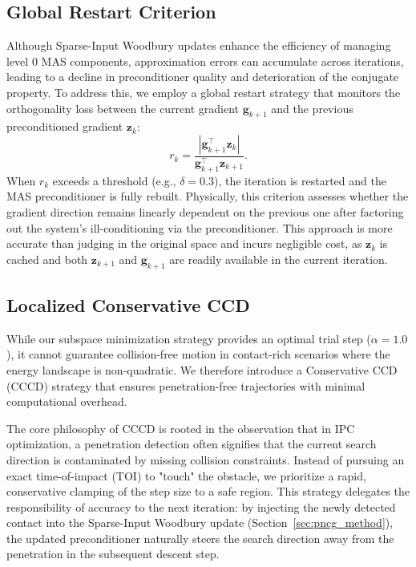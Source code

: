 \documentclass[acmtog,anonymous,review,screen,nonacm]{acmart}
\begin{document}
\subsection{Global Restart Criterion}
\label{sec:restart}
Although Sparse-Input Woodbury updates enhance the efficiency of managing level $0$ MAS components, approximation errors can accumulate across iterations, leading to a decline in preconditioner quality and deterioration of the conjugate property. To address this, we employ a global restart strategy that monitors the orthogonality loss between the current gradient $\mathbf{g}_{k+1}$ and the previous preconditioned gradient $\mathbf{z}_k$:
\begin{equation}
    r_k = \frac{|\mathbf{g}_{k+1}^\top \mathbf{z}_k|}{\mathbf{g}_{k+1}^\top \mathbf{z}_{k+1}}.
\end{equation}
When $r_k$ exceeds a threshold (e.g., $\delta =0.3$), the iteration is restarted and the MAS preconditioner is fully rebuilt. Physically, this criterion assesses whether the gradient direction remains linearly dependent on the previous one after factoring out the system's ill-conditioning via the preconditioner. This approach is more accurate than judging in the original space and incurs negligible cost, as $\mathbf{z}_k$ is cached and both $\mathbf{z}_{k+1}$ and $\mathbf{g}_{k+1}$ are readily available in the current iteration.
\vspace{-5pt} 
\subsection{Localized Conservative CCD}
\label{sec:conservative_ccd}
While our subspace minimization strategy provides an optimal trial step ($\alpha = 1.0$), it cannot guarantee collision-free motion in contact-rich scenarios where the energy landscape is non-quadratic. We therefore introduce a Conservative CCD (CCCD) strategy that ensures penetration-free trajectories with minimal computational overhead. 

The core philosophy of CCCD is rooted in the observation that in IPC optimization, a penetration detection often signifies that the current search direction is contaminated by missing collision constraints. Instead of pursuing an exact time-of-impact (TOI) to "touch" the obstacle, we prioritize a rapid, conservative clamping of the step size to a safe region. This strategy delegates the responsibility of accuracy to the next iteration: by injecting the newly detected contact into the Sparse-Input Woodbury update (Section~\ref{sec:pncg_method}), the updated preconditioner naturally steers the search direction away from the penetration in the subsequent descent step.
\end{document}
